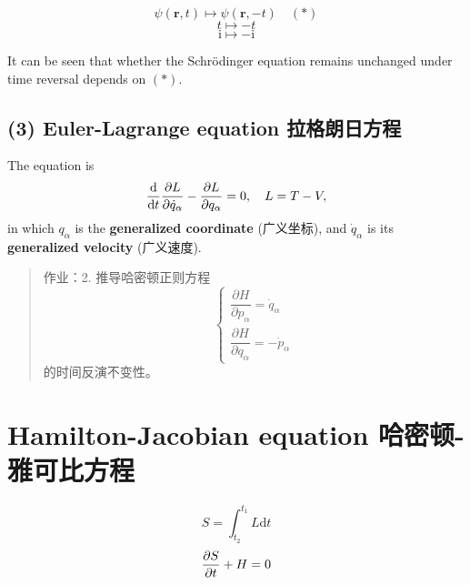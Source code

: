 \[\psi(\boldsymbol r, t) \mapsto \psi(\boldsymbol r,-t) \quad (*)\] \[t \mapsto -t\] \[\mathrm i \mapsto -\mathrm i\]

It can be seen that whether the Schrödinger equation remains unchanged under time reversal depends on \((*)\).

\subsection*{(3) Euler-Lagrange equation 拉格朗日方程}\label{euler-lagrange-equation-ux62c9ux683cux6717ux65e5ux65b9ux7a0b}

The equation is \[{\mathrm d \over \mathrm dt} {\partial L \over \partial \dot q_\alpha}- {\partial L \over \partial q_\alpha}=0, \quad L= T - V,\] in which \(q_\alpha\) is the \textbf{generalized coordinate} (广义坐标), and \(\dot q_\alpha\) is its \textbf{generalized velocity} (广义速度).

\begin{quote}
作业：2. 推导哈密顿正则方程 \[
\left \{
    \begin{array} {l}
        \dfrac{\partial H}{\partial p_\alpha}=\dot q_\alpha \\[1.5ex]
        \dfrac{\partial H}{\partial q_\alpha}=-\dot p_\alpha
    \end{array}
\right.
\] 的时间反演不变性。
\end{quote}

\section{Hamilton-Jacobian equation 哈密顿-雅可比方程}\label{hamilton-jacobian-equation-ux54c8ux5bc6ux987f-ux96c5ux53efux6bd4ux65b9ux7a0b}

\[S= \int^{t_1}_{t_2} L \mathrm dt\] \[ {\partial S \over \partial t}+H =0\]
